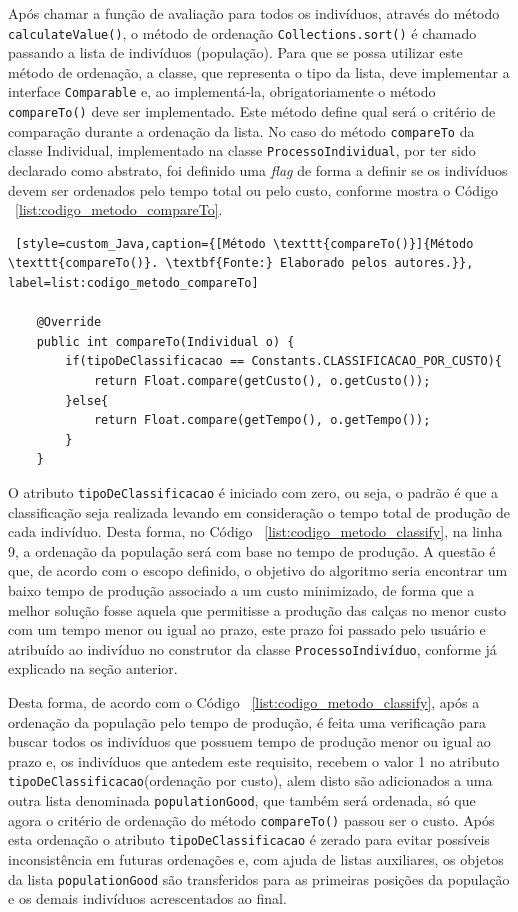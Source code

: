 \par Após chamar a função de avaliação para todos os indivíduos, através do método \texttt{calculateValue()}, o método
de ordenação \texttt{Collections.sort()} é chamado passando a lista de indivíduos (população). Para que se possa utilizar este método
de ordenação, a classe, que representa o tipo da lista, deve implementar a interface
\texttt{Comparable} e, ao implementá-la, obrigatoriamente o método \texttt{compareTo()} deve ser implementado. Este método
define qual será o critério de comparação durante a ordenação da lista. No caso do método \texttt{compareTo} da classe Individual, 
implementado na classe \texttt{ProcessoIndividual}, por ter sido declarado como abstrato, foi definido uma \textit{flag} de forma a
definir se os indivíduos devem ser ordenados pelo tempo total ou pelo custo, conforme mostra o Código ~\ref{list:codigo_metodo_compareTo}.

\begin{lstlisting} [style=custom_Java,caption={[Método \texttt{compareTo()}]{Método \texttt{compareTo()}. \textbf{Fonte:} Elaborado pelos autores.}}, label=list:codigo_metodo_compareTo] 

	@Override
	public int compareTo(Individual o) {
		if(tipoDeClassificacao == Constants.CLASSIFICACAO_POR_CUSTO){
			return Float.compare(getCusto(), o.getCusto());
		}else{
			return Float.compare(getTempo(), o.getTempo());
		}
	}

\end{lstlisting}

\par O atributo \texttt{tipoDeClassificacao} é iniciado com zero, ou seja, o padrão é que a classificação seja realizada levando 
em consideração o tempo total de produção de cada indivíduo. Desta forma, no Código  ~\ref{list:codigo_metodo_classify}, na linha
9, a ordenação da população será com base no tempo de produção. A questão é que, de acordo com o escopo definido, o objetivo do 
algoritmo seria encontrar um baixo tempo de produção associado a um custo minimizado, de forma que a melhor solução fosse aquela
que permitisse a produção das calças no menor custo com um tempo menor ou igual ao prazo, este prazo foi passado pelo usuário e
atribuído ao indivíduo no construtor da classe \texttt{ProcessoIndivíduo}, conforme já explicado na seção anterior. 

\par Desta forma, de acordo com o Código ~\ref{list:codigo_metodo_classify}, após a ordenação da população pelo tempo de produção, 
é feita uma verificação para buscar todos os indivíduos que possuem tempo de produção menor ou igual ao prazo e, os indivíduos que antedem este requisito, recebem o valor 1 no atributo \texttt{tipoDeClassificacao}(ordenação por custo), alem disto são adicionados a uma outra lista denominada \texttt{populationGood}, que também será ordenada, só que agora o critério de ordenação do método \texttt{compareTo()} passou ser o custo. Após esta ordenação o atributo \texttt{tipoDeClassificacao} é zerado para evitar possíveis inconsistência em futuras ordenações e, com ajuda de listas auxiliares, os objetos da lista \texttt{populationGood} são transferidos para as primeiras posições da população e os demais indivíduos acrescentados ao final.


